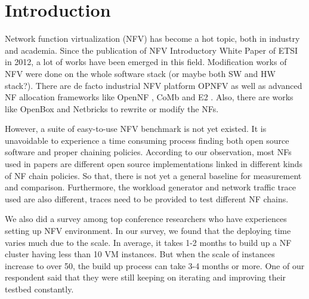 \documentclass{sig-alternate-10pt}
\begin{document}


%
%

%
%



\section{Introduction}

Network function virtualization (NFV) has become a hot topic, both in industry and academia. Since the publication of NFV Introductory White Paper \cite{} of ETSI in 2012, a lot of works have been emerged in this field. Modification works of NFV were done on the whole software stack (or maybe both SW and HW stack?). There are de facto industrial NFV platform OPNFV \cite{noauthor_home_nodate} as well as advanced NF allocation frameworks like OpenNF \cite{gember-jacobson_opennf:_2014}, CoMb \cite{180672} and E2 \cite{palkar_e2:_2015}. Also, there are works like OpenBox \cite{bremler-barr_openbox:_2016} and Netbricks \cite{199352} to rewrite or modify the NFs.


However, a suite of easy-to-use NFV benchmark is not yet existed. It is unavoidable to experience a time consuming process finding both open source software and proper chaining policies. According to our observation, most NFs used in papers are different open source implementations linked in different kinds of NF chain policies. So that, there is not yet a general baseline for measurement and comparison. Furthermore, the workload generator and network traffic trace used are also different, traces need to be provided to test different NF chains.

We also did a survey among top conference researchers who have experiences setting up NFV environment. In our survey, we found that the deploying time varies much due to the scale. In average, it takes 1-2 months to build up a NF cluster having less than 10 VM instances. But when the scale of instances increase to over 50, the build up process can take 3-4 months or more. One of our respondent said that they were still keeping on iterating and improving their testbed constantly.
\end{document}

